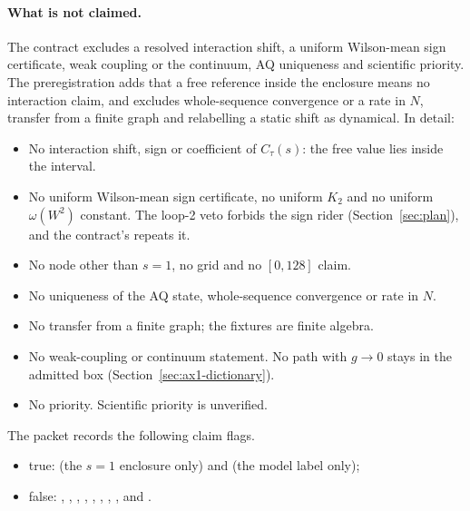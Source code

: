 \paragraph{What is not claimed.}
The contract excludes a resolved interaction shift, a uniform Wilson-mean sign
certificate, weak coupling or the continuum, AQ uniqueness and scientific
priority. The preregistration adds that a free reference inside the enclosure
means no interaction claim, and excludes whole-sequence convergence or a rate
in $N$, transfer from a finite graph and relabelling a static shift as
dynamical. In detail:
\begin{itemize}
\item No interaction shift, sign or coefficient of $C_\tau(s)$: the free value
lies inside the interval.
\item No uniform Wilson-mean sign certificate, no uniform $K_2$ and no uniform
$\omega(W^2)$ constant. The loop-2 veto forbids the sign rider
(Section~\ref{sec:plan}), and the contract's  repeats it.
\item No node other than $s=1$, no grid and no $[0,128]$ claim.
\item No uniqueness of the AQ state, whole-sequence convergence or rate in
$N$.
\item No transfer from a finite graph; the fixtures are finite algebra.
\item No weak-coupling or continuum statement. No path with $g\to0$ stays in
the admitted box (Section~\ref{sec:ax1-dictionary}).
\item No priority. Scientific priority is unverified.
\end{itemize}
The packet records the following claim flags.
\begin{itemize}\raggedright
\item true:  (the $s=1$ enclosure only) and
 (the model label only);
\item false: , ,
, ,
, ,
, ,
 and
.
\end{itemize}

